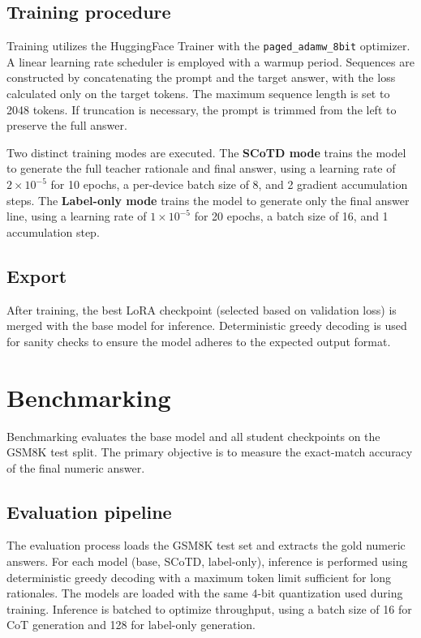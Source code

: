 \subsection{Training procedure}
Training utilizes the HuggingFace Trainer with the \texttt{paged\_adamw\_8bit} optimizer. A linear learning rate scheduler is employed with a warmup period. Sequences are constructed by concatenating the prompt and the target answer, with the loss calculated only on the target tokens. The maximum sequence length is set to 2048 tokens. If truncation is necessary, the prompt is trimmed from the left to preserve the full answer.

Two distinct training modes are executed. The \textbf{SCoTD mode} trains the model to generate the full teacher rationale and final answer, using a learning rate of $2{\times}10^{-5}$ for 10 epochs, a per-device batch size of 8, and 2 gradient accumulation steps. The \textbf{Label-only mode} trains the model to generate only the final answer line, using a learning rate of $1{\times}10^{-5}$ for 20 epochs, a batch size of 16, and 1 accumulation step.

\subsection{Export}
After training, the best LoRA checkpoint (selected based on validation loss) is merged with the base model for inference. Deterministic greedy decoding is used for sanity checks to ensure the model adheres to the expected output format.

\section{Benchmarking}
Benchmarking evaluates the base model and all student checkpoints on the GSM8K test split. The primary objective is to measure the exact-match accuracy of the final numeric answer.

\subsection{Evaluation pipeline}
The evaluation process loads the GSM8K test set and extracts the gold numeric answers. For each model (base, SCoTD, label-only), inference is performed using deterministic greedy decoding with a maximum token limit sufficient for long rationales. The models are loaded with the same 4-bit quantization used during training. Inference is batched to optimize throughput, using a batch size of 16 for CoT generation and 128 for label-only generation.

